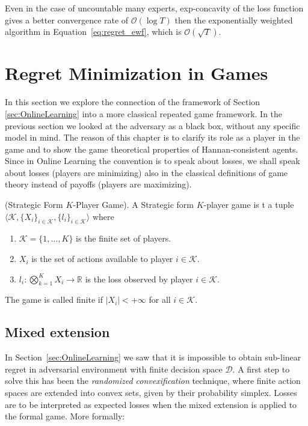 Even in the case of uncountable many experts, exp-concavity of the loss function gives a better convergence rate of $\mathcal O(\log T)$ then the exponentially weighted algorithm in Equation~\eqref{eq:regret_ewf}, which is $\mathcal O(\sqrt T)$.

\section{Regret Minimization in Games}
\label{sec:GT}
In this section we explore the connection of the framework of Section \ref{sec:OnlineLearning} into a more classical repeated game framework. In the previous section we looked at the adversary as a black box, without any specific model in mind. The reason of this chapter is to clarify its role as a player in the game and to show the game theoretical properties of Hannan-consistent agents. Since in Online Learning the convention is to speak about losses, we shall speak about losses (players are minimizing) also in the classical definitions of game theory instead of payoffs (players are maximizing).

\begin{definition}(Strategic Form $K$-Player Game).\label{def:Game}
    A Strategic form $K$-player game is t a tuple $\langle\mathcal K,\{X_i\}_{i\in\mathcal K},\{l_i\}_{i\in\mathcal K}\rangle$ where
    \begin{enumerate}
        \item $\mathcal K=\{1,\ldots,K\}$ is the finite set of players.
        \item $X_i$ is the set of actions available to player $i\in\mathcal K$.
        \item $l_i:\bigotimes\limits_{k=1}^KX_i\to\mathbb R$ is the loss observed by player $i\in\mathcal K$.
    \end{enumerate}
	The game is called finite if $|X_i|<+\infty$ for all $i\in\mathcal K$.
\end{definition}


\subsection{Mixed extension}\label{sec:mixed}
In Section~\ref{sec:OnlineLearning} we saw that it is impossible to obtain sub-linear regret in adversarial environment with finite decision space $\mathcal D$. A first step to solve this has been the \emph{randomized convexification} technique, where finite action spaces are extended into convex sets, given by their probability simplex. Losses are to be interpreted as expected losses when the mixed extension is applied to the formal game. More formally: 

